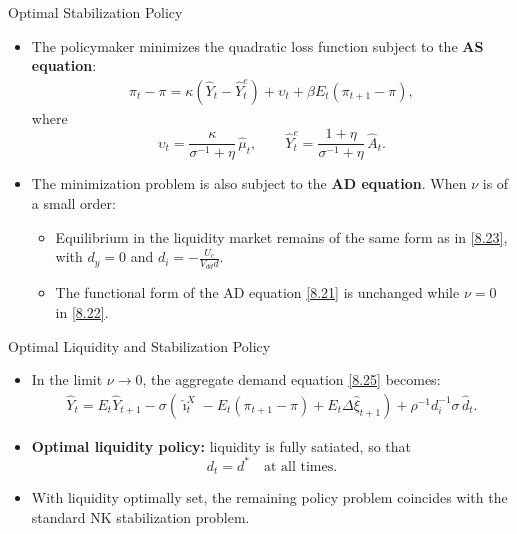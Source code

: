 \documentclass[11pt,aspectratio=169]{beamer}
\begin{document}
\begin{frame}{Optimal Stabilization Policy}

\begin{itemize}
  \item The policymaker minimizes the quadratic loss function subject to the
  \textbf{AS equation}:
  \begin{align}
    \pi_t - \pi
    = \kappa(\hat Y_t - \hat Y_t^e)
      + \upsilon_t
      + \beta E_t(\pi_{t+1} - \pi), \label{8.28}
  \end{align}
  where
  \[
    \upsilon_t = \frac{\kappa}{\sigma^{-1}+\eta}\,\hat\mu_t,
    \qquad
    \hat Y_t^e = \frac{1+\eta}{\sigma^{-1}+\eta}\,\hat A_t .
  \]

  \item The minimization problem is also subject to the \textbf{AD equation}.
  When $\nu$ is of a small order:
  \begin{itemize}
    \item Equilibrium in the liquidity market remains of the same form as in
    \eqref{8.23}, with $d_y = 0$ and $d_i = -\frac{U_c}{V_{dd} d}$.
    \item The functional form of the AD equation \eqref{8.21} is unchanged while $\nu = 0$ in \eqref{8.22}.
  \end{itemize}
\end{itemize}

\end{frame}

\begin{frame}{Optimal Liquidity and Stabilization Policy}
\small
\begin{itemize}
  \item In the limit $\nu \to 0$, the aggregate demand equation \eqref{8.25} becomes:
  \begin{align}
    \hat Y_t
    = E_t \hat Y_{t+1}
      - \sigma\!\left(
        \hat{\imath}_t^X - E_t(\pi_{t+1}-\pi)
        + E_t\Delta\hat\xi_{t+1}
      \right)
      + \rho^{-1} d_i^{-1}\sigma\,\hat d_t. \label{8.29}
  \end{align}
  \vspace{0.4em}

  \item \textbf{Optimal liquidity policy:}
  liquidity is fully satiated, so that
  \[
    d_t = d^* \quad \text{at all times}.
  \]
  \vspace{0.4em}

  \item With liquidity optimally set, the remaining policy problem coincides
  with the standard NK stabilization problem.
\end{itemize}
\end{frame}
\end{document}
